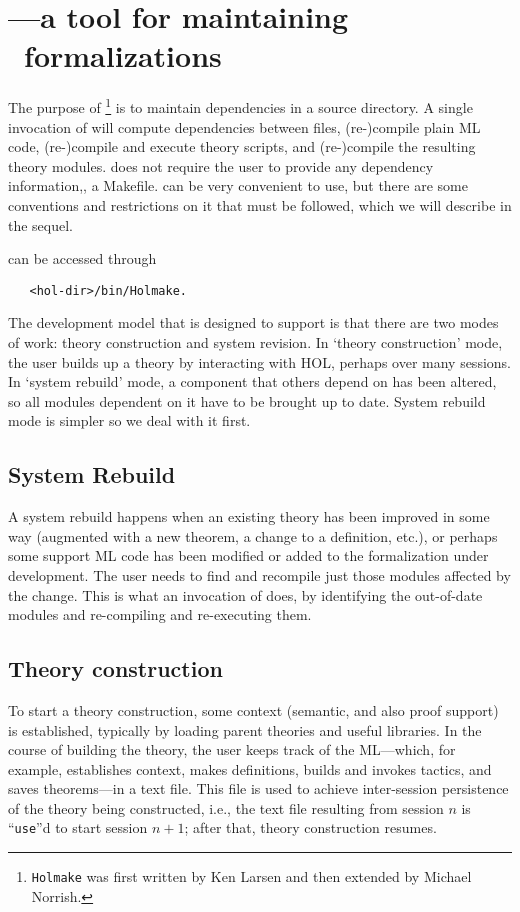 \section{\holmake---a tool for maintaining \HOL\ formalizations}
\label{Holmake}

The purpose of \holmake\footnote{{\tt Holmake} was first written by
  Ken Larsen and then extended by Michael Norrish.} is to maintain
dependencies in a \holn{} source directory. A single invocation of
\holmake{} will compute dependencies between files, (re-)compile plain
ML code, (re-)compile and execute theory scripts, and (re-)compile the
resulting theory modules. \holmake{} does not require the user to
provide any dependency information,\eg, a Makefile. \holmake{} can
be very convenient to use, but there are some conventions and
restrictions on it that must be followed, which we will describe in
the sequel.

\holmake{} can be accessed through
\begin{verbatim}
   <hol-dir>/bin/Holmake.
\end{verbatim}

The development model that \holmake{} is designed to support is that
there are two modes of work: theory construction and system revision.
In `theory construction' mode, the user builds up a theory by
interacting with HOL, perhaps over many sessions. In `system rebuild'
mode, a component that others depend on has been altered, so all modules
dependent on it have to be brought up to date. System rebuild mode is
simpler so we deal with it first.

\subsection{System Rebuild}

A system rebuild happens when an existing theory has been improved in
some way (augmented with a new theorem, a change to a definition, etc.),
or perhaps some support ML code has been modified or added to the
formalization under development. The user needs to find and recompile
just those modules affected by the change. This is what an invocation of
\holmake{} does, by identifying the out-of-date modules and
re-compiling and re-executing them.


\subsection{Theory construction}

To start a theory construction, some context (semantic, and also proof
support) is established, typically by loading parent theories and
useful libraries. In the course of building the theory, the user keeps
track of the ML---which, for example, establishes context, makes
definitions, builds and invokes tactics, and saves theorems---in a
text file. This file is used to achieve inter-session persistence of
the theory being constructed, i.e., the text file resulting from
session $n$ is ``\verb+use+''d to start session $n+1$; after that,
theory construction resumes.

